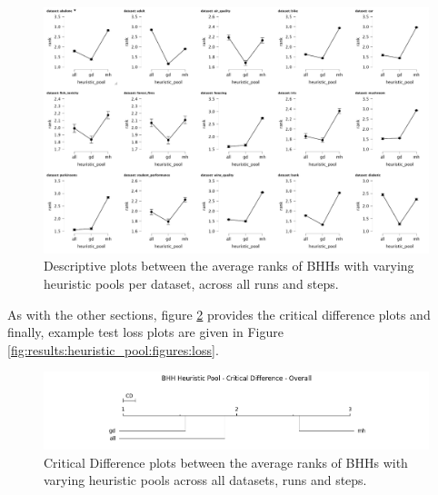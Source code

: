 \begin{figure}[htbp]
	\centering
	\includegraphics[width=\textwidth]{analysis/bhh_heuristic_pool/figures/descriptive/descriptive.png}
	\caption{Descriptive plots between the average ranks of \Acsp{BHH} with varying heuristic pools per dataset, across all runs and steps.}
	\label{fig:results:heuristic_pool:descriptive:descriptive}
\end{figure}

As with the other sections, figure \ref{fig:results:heuristic_pool:descriptive:cd} provides the critical difference plots and finally, example test loss plots are given in Figure \ref{fig:results:heuristic_pool:figures:loss}.

\begin{figure}[htbp]
	\centering
	\includegraphics[width=\textwidth]{analysis/bhh_heuristic_pool/figures/cd/overall.png}
	\caption{Critical Difference plots between the average ranks of \Acsp{BHH} with varying heuristic pools across all datasets, runs and steps.}
	\label{fig:results:heuristic_pool:descriptive:cd}
\end{figure}



